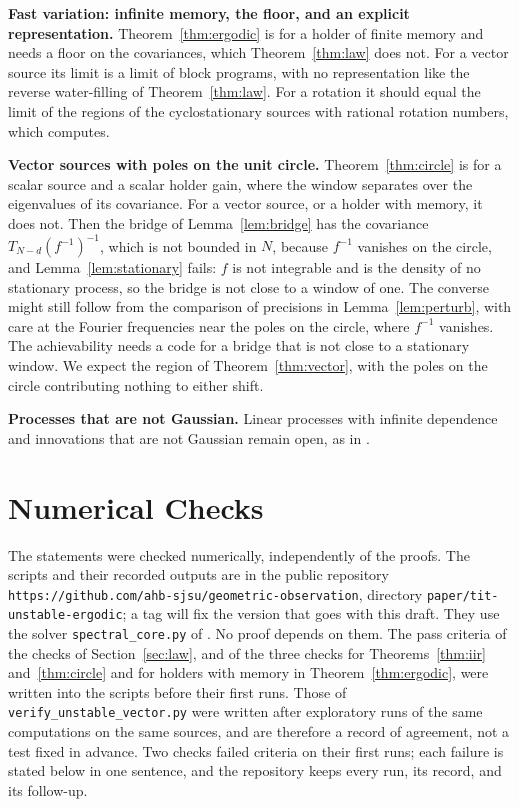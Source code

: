 \documentclass[11pt,onecolumn]{IEEEtran}
\begin{document}
\textbf{Fast variation: infinite memory, the floor, and an explicit
representation.} Theorem~\ref{thm:ergodic} is for a holder of finite
memory and needs a floor on the covariances, which
Theorem~\ref{thm:law} does not. For a vector source its limit is a limit
of block programs, with no representation like the reverse water-filling
of Theorem~\ref{thm:law}. For a rotation it should equal the limit of the regions of the
cyclostationary sources with rational rotation numbers, which
\cite[Theorem~18]{part3} computes.

\textbf{Vector sources with poles on the unit circle.}
Theorem~\ref{thm:circle} is for a scalar source and a scalar holder
gain, where the window separates over the eigenvalues of its
covariance. For a vector source, or a holder with memory, it does not.
Then the bridge of Lemma~\ref{lem:bridge} has the covariance
$T_{N-d}(f^{-1})^{-1}$, which is not bounded in $N$, because
$f^{-1}$ vanishes on the circle, and Lemma~\ref{lem:stationary} fails:
$f$ is not integrable and is the
density of no stationary process, so the bridge is not close to a
window of one. The converse might still follow from the comparison of
precisions in Lemma~\ref{lem:perturb}, with care at the Fourier
frequencies near the poles on the circle, where $f^{-1}$ vanishes. The
achievability needs a code for a bridge that is not close to a
stationary window. We expect the region of Theorem~\ref{thm:vector},
with the poles on the circle contributing nothing to either shift.

\textbf{Processes that are not Gaussian.} Linear processes with
infinite dependence and innovations that are not Gaussian remain open,
as in \cite{part3}.

\appendices

\section{Numerical Checks}
\label{app:numver}
\sloppy

The statements were checked numerically, independently of the proofs.
The scripts and their recorded outputs are in the public repository
\texttt{https://github.com/ahb-sjsu/geometric-observation}, directory
\texttt{paper/tit-unstable-ergodic}; a tag will fix the version that goes
with this draft. They use the solver \texttt{spectral\_core.py} of
\cite{part2}. No proof depends on them. The pass criteria of the checks
of Section~\ref{sec:law}, and of the three checks for
Theorems~\ref{thm:iir} and~\ref{thm:circle} and for holders with memory
in Theorem~\ref{thm:ergodic}, were written into the scripts before their
first runs. Those of \texttt{verify\_unstable\_vector.py} were written
after exploratory runs of the same computations on the same sources,
and are therefore a record of agreement, not a test fixed in advance.
Two checks failed criteria on their first runs; each failure is stated
below in one sentence, and the repository keeps every run, its record,
and its follow-up.
\end{document}
